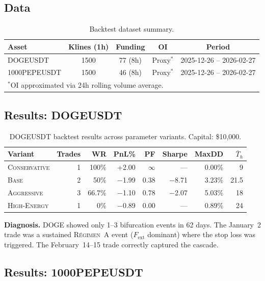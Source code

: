 \documentclass[11pt,a4paper]{article}
\newcommand{\Fext}{F_{\mathrm{ext}}}
\newcommand{\regime}[1]{\textsc{R\'{e}gimen~#1}}
\begin{document}
\subsection{Data}

\begin{table}[H]
\centering
\caption{Backtest dataset summary.}
\label{tab:data}
\begin{tabular}{lcccc}
\toprule
Asset & Klines (1h) & Funding & OI & Period \\
\midrule
DOGEUSDT & 1500 & 77 (8h) & Proxy$^*$ & 2025-12-26 -- 2026-02-27 \\
1000PEPEUSDT & 1500 & 46 (8h) & Proxy$^*$ & 2025-12-26 -- 2026-02-27 \\
\bottomrule
\multicolumn{5}{l}{\footnotesize $^*$OI approximated via 24h rolling volume average.}
\end{tabular}
\end{table}


\subsection{Results: DOGEUSDT}

\begin{table}[H]
\centering
\caption{DOGEUSDT backtest results across parameter variants. Capital: \$10,000.}
\label{tab:doge}
\renewcommand{\arraystretch}{1.15}
\begin{tabular}{lrrrrrrr}
\toprule
Variant & Trades & WR & PnL\% & PF & Sharpe & MaxDD & $\bar{T}_h$ \\
\midrule
\textsc{Conservative} & 1 & 100\% & +2.00 & $\infty$ & --- & 0.00\% & 9 \\
\textsc{Base} & 2 & 50\% & $-$1.99 & 0.38 & $-$8.71 & 3.23\% & 21.5 \\
\textsc{Aggressive} & 3 & 66.7\% & $-$1.10 & 0.78 & $-$2.07 & 5.03\% & 18 \\
\textsc{High-Energy} & 1 & 0\% & $-$0.89 & 0.00 & --- & 0.89\% & 24 \\
\bottomrule
\end{tabular}
\end{table}

\noindent\textbf{Diagnosis.} DOGE showed only 1--3 bifurcation events in 62 
days. The January~2 trade was a sustained \regime{A} event ($\Fext$ dominant) 
where the stop loss was triggered. The February~14--15 trade correctly captured 
the cascade.


\subsection{Results: 1000PEPEUSDT}
\end{document}
